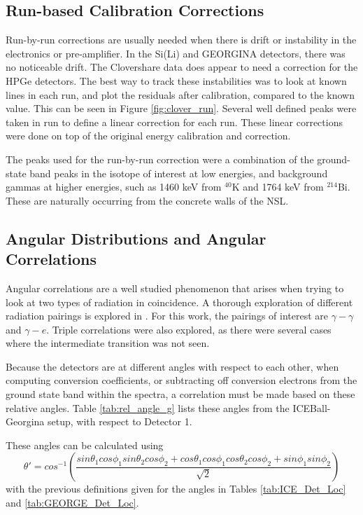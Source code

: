 \subsection{Run-based Calibration Corrections}

Run-by-run corrections are usually needed when there is drift or instability in the electronics or pre-amplifier. In the Si(Li) and GEORGINA detectors, there was no noticeable drift. The Clovershare data does appear to need a correction for the HPGe detectors. The best way to track these instabilities was to look at known lines in each run, and plot the residuals after calibration, compared to the known value. This can be seen in Figure \ref{fig:clover_run}.  Several well defined peaks were taken in run to define a linear correction for each run. These linear corrections were done on top of the original energy calibration and correction.



The peaks used for the run-by-run correction were a combination of the ground-state band peaks in the isotope of interest at low energies, and background gammas at higher energies, such as 1460 keV from $^{40}$K and 1764 keV from $^{214}$Bi. These are naturally occurring from the concrete walls of the NSL.

\subsection{Angular Distributions and Angular Correlations}
\label{sec:angular}

Angular correlations are a well studied phenomenon that arises when trying to look at two types of radiation in coincidence. A thorough exploration of different radiation pairings is explored in \citep{biedenharn53:_theory_angular_corr}. For this work, the pairings of interest are $\gamma-\gamma$ and $\gamma-e$. Triple correlations were also explored, as there were several cases where the intermediate transition was not seen. 

Because the detectors are at different angles with respect to each other, when computing conversion coefficients, or subtracting off conversion electrons from the ground state band within the spectra, a correlation must be made based on these relative angles. Table \ref{tab:rel_angle_g} lists these angles from the ICEBall-Georgina setup, with respect to Detector 1. 

These angles can be calculated using
\begin{equation}
    \theta ' = cos^{-1}(\frac{sin\theta_1 cos\phi_1 sin\theta_2 cos\phi_2 +cos\theta_1 cos\phi_1 cos\theta_2 cos\phi_2 + sin\phi_1 sin\phi_2}{\sqrt{2}})
    \label{eq:rel_angle}
\end{equation}
with the previous definitions given for the angles in Tables \ref{tab:ICE_Det_Loc} and \ref{tab:GEORGE_Det_Loc}.

